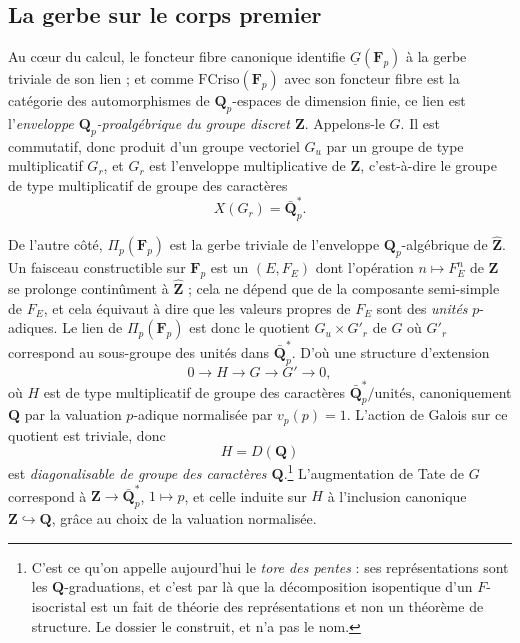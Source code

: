 \documentclass[11pt,a4paper]{article}
\begin{document}
\subsection*{La gerbe sur le corps premier}

Au cœur du calcul, le foncteur fibre canonique identifie
$\underline{G}(\mathbf{F}_{p})$ à la gerbe triviale de son lien ; et comme
$\mathrm{FCriso}(\mathbf{F}_{p})$ avec son foncteur fibre est la catégorie des
automorphismes de $\mathbf{Q}_{p}$-espaces de dimension finie, ce lien est
l'\emph{enveloppe $\mathbf{Q}_{p}$-proalgébrique du groupe discret
$\mathbf{Z}$}. Appelons-le $G$. Il est commutatif, donc produit d'un groupe
vectoriel $G_{u}$ par un groupe de type multiplicatif $G_{r}$, et $G_{r}$ est
l'enveloppe multiplicative de $\mathbf{Z}$, c'est-à-dire le groupe de type
multiplicatif de groupe des caractères
\[
X(G_{r}) = \bar{\mathbf{Q}}_{p}^{*} .
\]

De l'autre côté, $\Pi_{p}(\mathbf{F}_{p})$ est la gerbe triviale de l'enveloppe
$\mathbf{Q}_{p}$-algébrique de $\hat{\mathbf{Z}}$. Un faisceau constructible
sur $\mathbf{F}_{p}$ est un $(E, F_{E})$ dont l'opération $n \mapsto F_{E}^{n}$
de $\mathbf{Z}$ se prolonge continûment à $\hat{\mathbf{Z}}$ ; cela ne dépend
que de la composante semi-simple de $F_{E}$, et cela équivaut à dire que
les valeurs propres de $F_{E}$ sont des \emph{unités} $p$-adiques. Le lien de
$\Pi_{p}(\mathbf{F}_{p})$ est donc le quotient $G_{u} \times G'_{r}$ de $G$ où
$G'_{r}$ correspond au sous-groupe des unités dans
$\bar{\mathbf{Q}}_{p}^{*}$. D'où une structure d'extension
\[
0 \longrightarrow H \longrightarrow G \longrightarrow G' \longrightarrow 0 ,
\]
où $H$ est de type multiplicatif de groupe des caractères
$\bar{\mathbf{Q}}_{p}^{*}/\text{unités}$, canoniquement $\mathbf{Q}$ par la
valuation $p$-adique normalisée par $v_{p}(p) = 1$. L'action de Galois sur ce
quotient est triviale, donc
\[
\boxed{\ H = D(\mathbf{Q}) \ }
\]
est \emph{diagonalisable de groupe des caractères $\mathbf{Q}$}.\footnote{C'est
ce qu'on appelle aujourd'hui le \emph{tore des pentes} : ses représentations
sont les $\mathbf{Q}$-graduations, et c'est par là que la décomposition
isopentique d'un $F$-isocristal est un fait de théorie des représentations et
non un théorème de structure. Le dossier le construit, et n'a pas le nom.}
L'augmentation de Tate de $G$ correspond à $\mathbf{Z} \to
\bar{\mathbf{Q}}_{p}^{*}$, $1 \mapsto p$, et celle induite sur $H$ à
l'inclusion canonique $\mathbf{Z} \hookrightarrow \mathbf{Q}$, grâce au
choix de la valuation normalisée.
\end{document}
